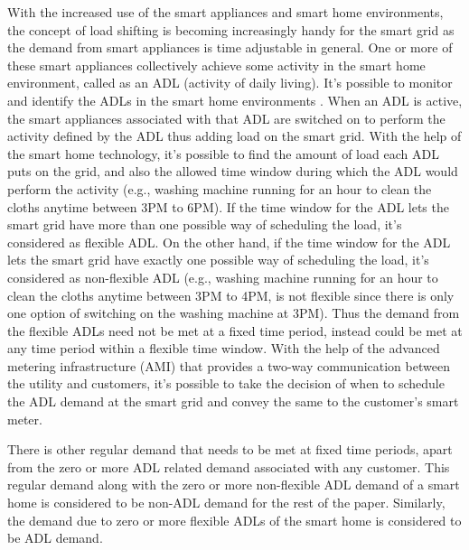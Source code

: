 With the increased use of the smart appliances and smart home environments, the concept of load shifting is becoming increasingly handy for the smart grid as the demand from smart appliances is time adjustable in general. One or more of these smart appliances collectively achieve some activity in the smart home environment, called as an ADL (activity of daily living). It's possible to monitor and identify the ADLs in the smart home environments \cite{GPG2016}. When an ADL is active, the smart appliances associated with that ADL are switched on to perform the activity defined by the ADL thus adding load on the smart grid. With the help of the smart home technology, it's possible to find the amount of load each ADL puts on the grid, and also the allowed time window during which the ADL would perform the activity (e.g., washing machine running for an hour to clean the cloths anytime between 3PM to 6PM). If the time window for the ADL lets the smart grid have more than one possible way of scheduling the load, it's considered as flexible ADL. On the other hand, if the time window for the ADL lets the smart grid have exactly one possible way of scheduling the load, it's considered as non-flexible ADL (e.g., washing machine running for an hour to clean the cloths anytime between 3PM to 4PM, is not flexible since there is only one option of switching on the washing machine at 3PM). Thus the demand from the flexible ADLs need not be met at a fixed time period, instead could be met at any time period within a flexible time window. With the help of the advanced metering infrastructure (AMI) that provides a two-way communication between the utility and customers, it's possible to take the decision of when to schedule the ADL demand at the smart grid and convey the same to the customer's smart meter.    

There is other regular demand that needs to be met at fixed time periods, apart from the zero or more ADL related demand associated with any customer. This regular demand along with the zero or more non-flexible ADL demand of a smart home is considered to be non-ADL demand for the rest of the paper. Similarly, the demand due to zero or more flexible ADLs of the smart home is considered to be ADL demand.

